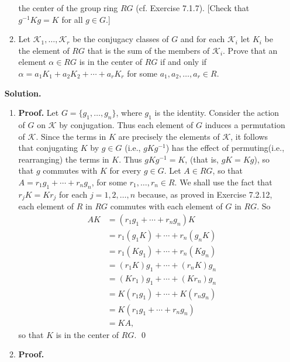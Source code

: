 \begin{enumerate}
\begin{enumerate}
                           the center of the group ring $RG$
                           (cf. Exercise 7.1.7). [Check that $g^{-1}Kg = K$ for
                           all $g \in G$.]
                     \item Let $\mathcal{K}_1, \ldots, \mathcal{K}_r$ be the
                           conjugacy classes of $G$ and for each $\mathcal{K}_i$
                           let $K_i$ be the element of $RG$ that is the sum of
                           the members of $\mathcal{K}_i$. Prove that an element
                           $\alpha \in RG$ is in the center of $RG$ if and only
                           if $\alpha = a_1K_1 + a_2K_2 + \cdots + a_rK_r$ for
                           some $a_1, a_2, \ldots, a_r \in R$.
                  \end{enumerate}

      \textbf{Solution.}

      \begin{enumerate}
         \item \textbf{Proof.} Let $G = \{g_1, \ldots, g_n\}$, where $g_1$ is
               the identity. Consider the action of $G$ on $\mathcal{K}$ by
               conjugation. Thus each element of $G$ induces a permutation of
               $\mathcal{K}$. Since the terms in $K$ are precisely the elements
               of $\mathcal{K}$, it follows that conjugating $K$ by $g \in G$
               (i.e., $gKg^{-1}$) has the effect of permuting(i.e., rearranging)
               the terms in $K$. Thus $gKg^{-1} = K$, (that is, $gK = Kg$), so
               that $g$ commutes with $K$ for every $g \in G$. Let $A \in RG$,
               so that $A = r_1g_1 + \cdots + r_ng_n$, for some
               $r_1, \ldots, r_n \in R$. We shall use the fact that
               $r_jK = Kr_j$ for each $j = 1, 2, \ldots, n$ because, as proved
               in Exercise 7.2.12, each element of $R$ in $RG$ commutes with
               each element of $G$ in $RG$. So
               \begin{align*}
                  AK &= (r_1g_1 + \cdots + r_ng_n)K \\
                     &= r_1(g_1K) + \cdots + r_n(g_nK) \\
                     &= r_1(Kg_1) + \cdots + r_n(Kg_n) \\
                     &= (r_1K)g_1 + \cdots + (r_nK)g_n \\
                     &= (Kr_1)g_1 + \cdots + (Kr_n)g_n \\
                     &= K(r_1g_1) + \cdots + K(r_ng_n) \\
                     &= K(r_1g_1 + \cdots + r_ng_n) \\
                     &= KA,
               \end{align*}
               so that $K$ is in the center of $RG$. \qed
         \item \textbf{Proof.}


\end{enumerate}
\end{enumerate}

